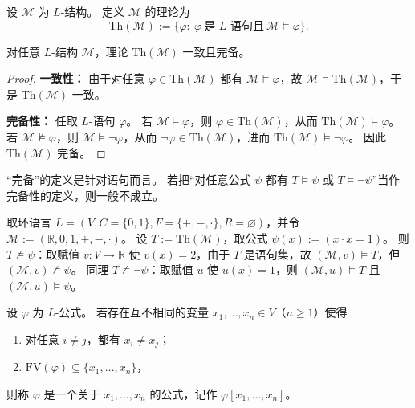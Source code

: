 \documentclass[lang=cn,a4paper,newtx,section]{elegantbook}
\begin{document}
 \begin{definition}[结构的理论]
 \label{theory-of-a-structure}
 设 $\mathcal M$ 为 $L$-结构。
 定义 $\mathcal M$ 的理论为
 \[
   \mathrm{Th}(\mathcal M):=\{\varphi:\ \varphi\ \text{是 $L$-语句且}\ \mathcal M\models\varphi\}.
 \]
 \end{definition}

 \begin{proposition}
 \label{theory-of-a-structure-complete-consistent}
 对任意 $L$-结构 $\mathcal M$，理论 $\mathrm{Th}(\mathcal M)$ 一致且完备。
 \end{proposition}

 \begin{proof}
 \textbf{一致性：} 由于对任意 $\varphi\in\mathrm{Th}(\mathcal M)$ 都有 $\mathcal M\models\varphi$，故 $\mathcal M\models\mathrm{Th}(\mathcal M)$，于是 $\mathrm{Th}(\mathcal M)$ 一致。

 \textbf{完备性：} 任取 $L$-语句 $\varphi$。
 若 $\mathcal M\models\varphi$，则 $\varphi\in\mathrm{Th}(\mathcal M)$，从而 $\mathrm{Th}(\mathcal M)\models\varphi$。
 若 $\mathcal M\not\models\varphi$，则 $\mathcal M\models\neg\varphi$，从而 $\neg\varphi\in\mathrm{Th}(\mathcal M)$，进而 $\mathrm{Th}(\mathcal M)\models\neg\varphi$。
 因此 $\mathrm{Th}(\mathcal M)$ 完备。
 \end{proof}

 \begin{remark}
 “完备”的定义是针对语句而言。
 若把“对任意公式 $\psi$ 都有 $T\models\psi$ 或 $T\models\neg\psi$”当作完备性的定义，则一般不成立。
 \end{remark}

 \begin{example}
 取环语言 $L=(V, C=\{0,1\}, F=\{+,-,\cdot\}, R=\varnothing)$，并令 $\mathcal M:=(\mathbb R,0,1,+,-,\cdot)$。
 设 $T:=\mathrm{Th}(\mathcal M)$，取公式 $\psi(x):=(x\cdot x=1)$。
 则 $T\not\models\psi$：取赋值 $v:V\to\mathbb R$ 使 $v(x)=2$，由于 $T$ 是语句集，故 $(\mathcal M,v)\models T$，但 $(\mathcal M,v)\not\models\psi$。
 同理 $T\not\models\neg\psi$：取赋值 $u$ 使 $u(x)=1$，则 $(\mathcal M,u)\models T$ 且 $(\mathcal M,u)\models\psi$。
 \end{example}

 \begin{definition}[$x_1,\dots,x_n$-公式]
 \label{formula-in-variables}
 设 $\varphi$ 为 $L$-公式。
 若存在互不相同的变量 $x_1,\dots,x_n\in V$（$n\ge 1$）使得
 \begin{enumerate}
   \item 对任意 $i\neq j$，都有 $x_i\neq x_j$；
   \item $\mathrm{FV}(\varphi)\subseteq\{x_1,\dots,x_n\}$，
 \end{enumerate}
 则称 $\varphi$ 是一个关于 $x_1,\dots,x_n$ 的公式，记作 $\varphi[x_1,\dots,x_n]$。
 \end{definition}
\end{document}

